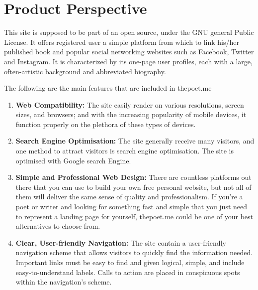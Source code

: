 \section{Product Perspective}

This site is supposed to be part of an open source, under the GNU general Public License. It offers registered user a simple platform from which to link his/her published book and popular social networking websites such as Facebook, Twitter and Instagram. It is characterized by its one-page user profiles, each with a large, often-artistic background and abbreviated biography.

The following are the main features that are included in thepoet.me

\begin{enumerate}
    \item \textbf{Web Compatibility:} The site easily render on various resolutions, screen sizes, and browsers; and with the increasing popularity of mobile devices, it function properly on the plethora of these types of devices.
    \item \textbf{Search Engine Optimisation:} The site generally receive many visitors, and one method to attract visitors is search engine optimisation. The site is optimised with Google search Engine.
    \item \textbf{Simple and Professional Web Design:} There are countless platforms out there that you can use to build your own free personal website, but not all of them will deliver the same sense of quality and professionalism. If you’re a poet or writer and looking for something fast and simple that you just need to represent a landing page for yourself, thepoet.me could be one of your best alternatives to choose from.
    \item \textbf{Clear, User-friendly Navigation:} The site contain a user-friendly navigation scheme that allows visitors to quickly find the information needed. Important links must be easy to find and given logical, simple, and include easy-to-understand labels. Calls to action are placed in conspicuous spots within the navigation’s scheme.
\end{enumerate}  
